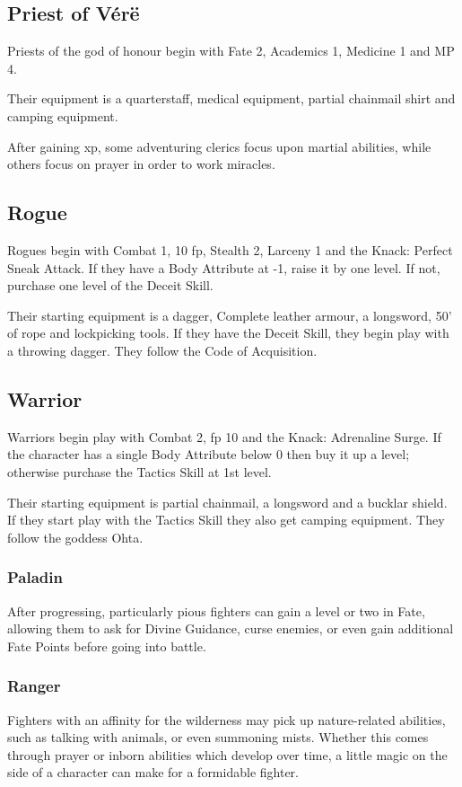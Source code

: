 \begin{multicols}{2}
\subsection{Priest of V\'{e}r\"{e}}

Priests of the god of honour begin with Fate 2, Academics 1, Medicine 1 and MP 4.

Their equipment is a quarterstaff, medical equipment, partial chainmail shirt and camping equipment.

After gaining \gls{xp}, some adventuring clerics focus upon martial abilities, while others focus on prayer in order to work miracles.

\subsection{Rogue}

Rogues begin with Combat 1, 10 \gls{fp}, Stealth 2, Larceny 1 and the Knack: Perfect Sneak Attack.
If they have a Body Attribute at -1, raise it by one level.
If not, purchase one level of the Deceit Skill.

Their starting equipment is a dagger, Complete leather armour, a longsword, 50' of rope and lockpicking tools.
If they have the Deceit Skill, they begin play with a throwing dagger.
They follow the Code of Acquisition.

\subsection{Warrior}

Warriors begin play with Combat 2, \gls{fp} 10 and the Knack: Adrenaline Surge.
If the character has a single Body Attribute below 0 then buy it up a level; otherwise purchase the Tactics Skill at 1st level.

Their starting equipment is partial chainmail, a longsword and a bucklar shield.
If they start play with the Tactics Skill they also get camping equipment.
They follow the goddess Ohta.

\subsubsection{Paladin}

After progressing, particularly pious fighters can gain a level or two in Fate, allowing them to ask for Divine Guidance, curse enemies, or even gain additional Fate Points before going into battle.

\subsubsection{Ranger}

Fighters with an affinity for the wilderness may pick up nature-related abilities, such as talking with animals, or even summoning mists.
Whether this comes through prayer or inborn abilities which develop over time, a little magic on the side of a character can make for a formidable fighter.

\end{multicols}


